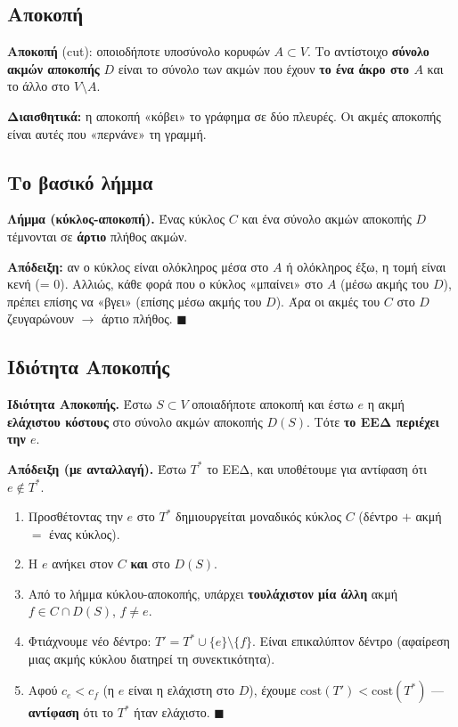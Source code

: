 \documentclass[11pt,a4paper]{article}
\begin{document}
\subsection{Αποκοπή}

\textbf{Αποκοπή} (cut): οποιοδήποτε υποσύνολο κορυφών $A \subset V$. Το
αντίστοιχο \textbf{σύνολο ακμών αποκοπής} $D$ είναι το σύνολο των ακμών που έχουν
\textbf{το ένα άκρο στο $A$} και το άλλο στο $V \setminus A$.

\begin{intuition}
\textbf{Διαισθητικά:} η αποκοπή «κόβει» το γράφημα σε δύο πλευρές. Οι ακμές
αποκοπής είναι αυτές που «περνάνε» τη γραμμή.
\end{intuition}

\subsection{Το βασικό λήμμα}

\begin{keypoint}
\textbf{Λήμμα (κύκλος-αποκοπή).} Ένας κύκλος $C$ και ένα σύνολο ακμών αποκοπής
$D$ τέμνονται σε \textbf{άρτιο} πλήθος ακμών.

\textbf{Απόδειξη:} αν ο κύκλος είναι ολόκληρος μέσα στο $A$ ή ολόκληρος έξω, η
τομή είναι κενή (= 0). Αλλιώς, κάθε φορά που ο κύκλος «μπαίνει» στο $A$ (μέσω
ακμής του $D$), πρέπει επίσης να «βγει» (επίσης μέσω ακμής του $D$). Άρα οι
ακμές του $C$ στο $D$ ζευγαρώνουν $\to$ άρτιο πλήθος. $\blacksquare$
\end{keypoint}

\subsection{Ιδιότητα Αποκοπής}

\begin{keypoint}
\textbf{Ιδιότητα Αποκοπής.} Έστω $S \subset V$ οποιαδήποτε αποκοπή και έστω $e$
η ακμή \textbf{ελάχιστου κόστους} στο σύνολο ακμών αποκοπής $D(S)$. Τότε
\textbf{το ΕΕΔ περιέχει την $e$}.
\end{keypoint}

\textbf{Απόδειξη (με ανταλλαγή).} Έστω $T^*$ το ΕΕΔ, και υποθέτουμε για αντίφαση
ότι $e \notin T^*$.
\begin{enumerate}
  \item Προσθέτοντας την $e$ στο $T^*$ δημιουργείται μοναδικός κύκλος $C$
  (δέντρο $+$ ακμή $=$ ένας κύκλος).
  \item Η $e$ ανήκει στον $C$ \textbf{και} στο $D(S)$.
  \item Από το λήμμα κύκλου-αποκοπής, υπάρχει \textbf{τουλάχιστον μία άλλη} ακμή
  $f \in C \cap D(S)$, $f \ne e$.
  \item Φτιάχνουμε νέο δέντρο: $T' = T^* \cup \{e\} \setminus \{f\}$. Είναι
  επικαλύπτον δέντρο (αφαίρεση μιας ακμής κύκλου διατηρεί τη συνεκτικότητα).
  \item Αφού $c_e < c_f$ (η $e$ είναι η ελάχιστη στο $D$), έχουμε
  $\text{cost}(T') < \text{cost}(T^*)$ --- \textbf{αντίφαση} ότι το $T^*$ ήταν
  ελάχιστο. $\blacksquare$
\end{enumerate}
\end{document}

